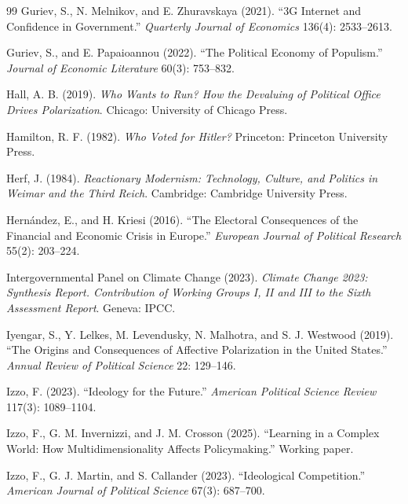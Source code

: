 \documentclass[12pt,letterpaper]{article}
\begin{document}
\begin{thebibliography}{99}
Guriev, S., N. Melnikov, and E. Zhuravskaya (2021). ``3G Internet and Confidence in Government.'' \textit{Quarterly Journal of Economics} 136(4): 2533--2613.

Guriev, S., and E. Papaioannou (2022). ``The Political Economy of Populism.'' \textit{Journal of Economic Literature} 60(3): 753--832.

Hall, A. B. (2019). \textit{Who Wants to Run? How the Devaluing of Political Office Drives Polarization}. Chicago: University of Chicago Press.

Hamilton, R. F. (1982). \textit{Who Voted for Hitler?} Princeton: Princeton University Press.

Herf, J. (1984). \textit{Reactionary Modernism: Technology, Culture, and Politics in Weimar and the Third Reich}. Cambridge: Cambridge University Press.

Hern\'{a}ndez, E., and H. Kriesi (2016). ``The Electoral Consequences of the Financial and Economic Crisis in Europe.'' \textit{European Journal of Political Research} 55(2): 203--224.

Intergovernmental Panel on Climate Change (2023). \textit{Climate Change 2023: Synthesis Report. Contribution of Working Groups I, II and III to the Sixth Assessment Report}. Geneva: IPCC.

Iyengar, S., Y. Lelkes, M. Levendusky, N. Malhotra, and S. J. Westwood (2019). ``The Origins and Consequences of Affective Polarization in the United States.'' \textit{Annual Review of Political Science} 22: 129--146.

Izzo, F. (2023). ``Ideology for the Future.'' \textit{American Political Science Review} 117(3): 1089--1104.

Izzo, F., G. M. Invernizzi, and J. M. Crosson (2025). ``Learning in a Complex World: How Multidimensionality Affects Policymaking.'' Working paper.

Izzo, F., G. J. Martin, and S. Callander (2023). ``Ideological Competition.'' \textit{American Journal of Political Science} 67(3): 687--700.


\end{thebibliography}
\end{document}
